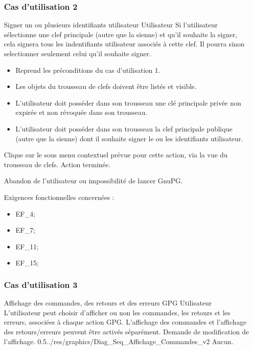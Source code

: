 \documentclass{../res/univ-projet}
\begin{document}
\subsubsection{Cas d'utilisation 2}
\fiche
{Signer un ou plusieurs identifiants utilisateur}
{Utilisateur}
{Si l'utilisateur sélectionne une clef principale (autre que la sienne) et qu'il souhaite la signer, cela signera tous les indentifiants 
utilisateur associés à cette clef. Il pourra sinon selectionner seulement celui qu'il souhaite signer.
}
{
  \begin{itemize}
    \item Reprend les préconditions du cas d'utilisation 1.
    \item Les objets du trousseau de clefs doivent être listés et visible.
    \item L'utilisateur doit posséder dans son trousseau une clé principale privée non expirée et non révoquée dans son trousseau.
    \item L'utilisateur doit posséder dans son trousseau la clef principale publique (autre que la sienne) dont il souhaite signer le ou les identifiants utilisateur.
  \end{itemize}
}
{Clique sur le sous menu contextuel prévue pour cette action, via la vue du trousseau de clefs.}
{Action terminée.}
{

}
{

}
{Abandon de l'utilisateur ou impossibilité de lancer GnuPG.}
\vspace{0.5cm}

Exigences fonctionnelles concernées :
\begin{itemize}
 \item EF\_4;
 \item EF\_7;
 \item EF\_11;
 \item EF\_15;
\end{itemize}

\subsubsection{Cas d'utilisation 3}
\ficheGraphic
{Affichage des commandes, des retours et des erreurs GPG}
{Utilisateur}
{L'utilisateur peut choisir d'afficher ou non les commandes, les retours et les erreurs, associées à chaque action GPG. L'affichage des commandes et l'affichage des retours/erreurs peuvent être activés séparément.}
{}
{Demande de modification de l'affichage.}
{}
{0.5}{../res/graphics/Diag_Seq_Affichage_Commandes_v2}
{Aucun.}   
\vspace{0.5cm}
\end{document}
